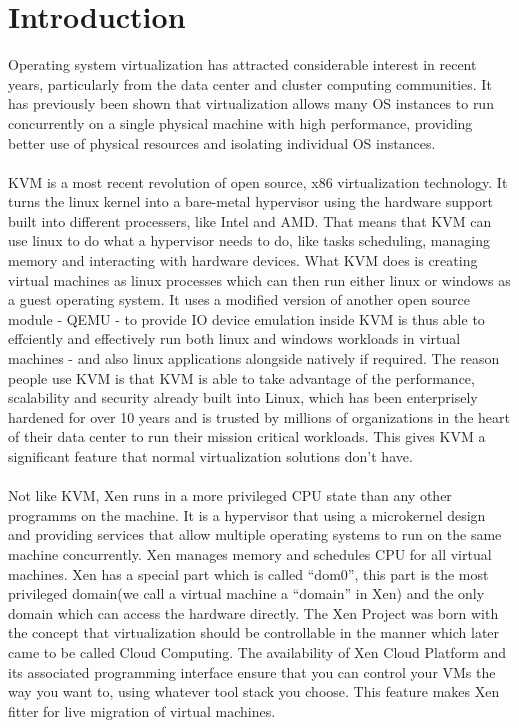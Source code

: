 \documentclass[runningheads]{llncs}
\begin{document}
\section{Introduction}
Operating system virtualization has attracted considerable interest in recent years, particularly from the data center and cluster computing communities. It has previously been shown that virtualization allows many OS instances to run concurrently on a single physical machine with high performance, providing better use of physical resources and isolating individual OS instances.
\\\\
KVM is a most recent revolution of open source, x86 virtualization technology. It turns the linux kernel into a bare-metal hypervisor using the hardware support built into different processers, like Intel and AMD. That means that KVM can use linux to do what a hypervisor needs to do, like tasks scheduling, managing memory and interacting with hardware devices. What KVM does is creating virtual machines as linux processes which can then run either linux or windows as a guest operating system. It uses a modified version of another open source module - QEMU - to provide IO device emulation inside KVM is thus able to effciently and effectively run both linux and windows workloads in virtual machines - and also linux applications alongside natively if required. The reason people use KVM is that KVM is able to take advantage of the performance, scalability and security already built into Linux, which has been enterprisely hardened for over 10 years and is trusted by millions of organizations in the heart of their data center to run their mission critical workloads. This gives KVM a significant feature that normal virtualization solutions don't have.
\\\\
Not like KVM, Xen runs in a more privileged CPU state than any other programms on the machine. It is a hypervisor that using a microkernel design and providing  services that allow multiple operating systems to run on the same machine concurrently. Xen manages memory and schedules CPU for all virtual machines. Xen has a special part which is called “dom0”, this part is the most privileged domain(we call a virtual machine a “domain” in Xen) and the only domain which can access the hardware directly. The Xen Project was born with the concept that virtualization should be controllable in the manner which later came to be called Cloud Computing.  The availability of Xen Cloud Platform and its associated programming interface ensure that you can control your VMs the way you want to, using whatever tool stack you choose\cite{mainpaper}. This feature makes Xen fitter for live migration of virtual machines.
\end{document}
